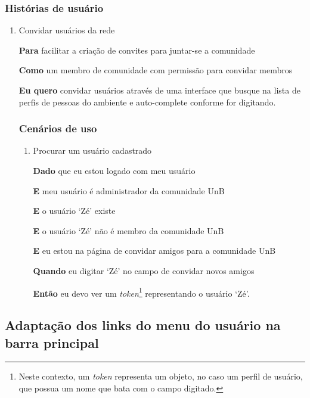 \subsubsection*{Histórias de usuário}

\begin{enumerate}

\item Convidar usuários da rede

\textbf{Para} facilitar a criação de convites para juntar-se a comunidade

\textbf{Como} um membro de comunidade com permissão para convidar membros

\textbf{Eu quero} convidar usuários através de uma interface que busque na lista
de perfis de pessoas do ambiente e auto-complete conforme for digitando.

\subsubsection*{Cenários de uso}

\begin{enumerate}

\item Procurar um usuário cadastrado

\textbf{Dado} que eu estou logado com meu usuário

\textbf{E} meu usuário é administrador da comunidade UnB

\textbf{E} o usuário `Zé' existe

\textbf{E} o usuário `Zé' não é membro da comunidade UnB

\textbf{E} eu estou na página de convidar amigos para a comunidade UnB

\textbf{Quando} eu digitar `Zé' no campo de convidar novos amigos

\textbf{Então} eu devo ver um \textit{token}\footnote{Neste contexto, um
\textit{token} representa um objeto, no caso um perfil de usuário, que possua
um nome que bata com o campo digitado.} representando o usuário `Zé'.

\end{enumerate}

\end{enumerate}


\subsection{Adaptação dos links do menu do usuário na barra principal}

